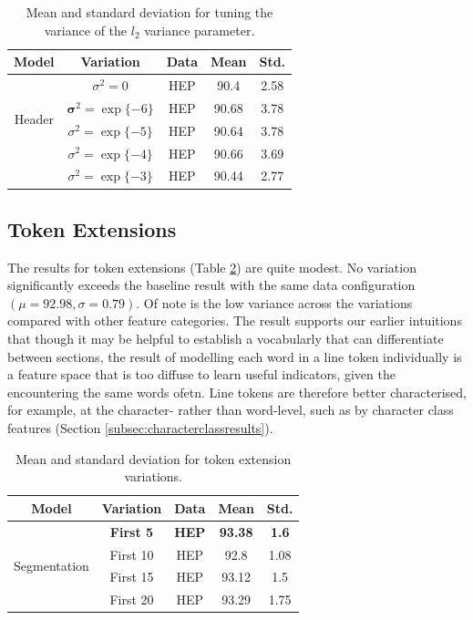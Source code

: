 \begin{table}[h]
\begin{center}
\begin{tabular}{|c|c|c|c|c|}
\hline
Model & Variation & Data & Mean & Std.\\
\hline
\multirow{4}{*}{Header} & $\sigma^2 = 0$ & HEP & 90.4 & 2.58\\\cline{2-5}
& $\mathbf \sigma^2 = \exp\{-6\}$ & HEP & 90.68 & 3.78\\\cline{2-5}
& $\sigma^2 = \exp\{-5\}$ & HEP & 90.64 & 3.78\\\cline{2-5}
& $\sigma^2 = \exp\{-4\}$ & HEP & 90.66 & 3.69\\\cline{2-5}
& $\sigma^2 = \exp\{-3\}$ & HEP & 90.44 & 2.77\\\cline{2-5}
\hline
\end{tabular}
\caption{Mean and standard deviation for tuning the variance of the $l_2$ variance parameter.}
\label{table:regularisationresults}
\end{center}
\end{table}

\subsection{Token Extensions}
\label{subsec:tokenextensionresults}

The results for token extensions (Table \ref{table:tokenextensions}) are quite modest. No variation significantly exceeds the baseline result with the same data configuration $(\mu = 92.98, \sigma = 0.79)$. Of note is the low variance across the variations compared with other feature categories. The result supports our earlier intuitions that though it may be helpful to establish a vocabularly that can differentiate between sections, the result of modelling each word in a line token individually is a feature space that is too diffuse to learn useful indicators, given the encountering the same words ofetn. Line tokens are therefore better characterised, for example, at the character- rather than word-level, such as by character class features (Section \ref{subsec:characterclassresults}).

\begin{table}[h]
\begin{center}
\begin{tabular}{|c|c|c|c|c|}
\hline
Model & Variation & Data & Mean & Std.\\
\hline
\multirow{4}{*}{Segmentation} & \textbf{First 5} & \textbf{HEP} & \textbf{93.38} & \textbf{1.6}\\\cline{2-5}
& First 10 & HEP & 92.8 & 1.08\\\cline{2-5}
& First 15 & HEP & 93.12 & 1.5\\\cline{2-5}
& First 20 & HEP & 93.29 & 1.75\\\cline{2-5}
\hline
\end{tabular}
\caption{Mean and standard deviation for token extension variations.}
\label{table:tokenextensions}
\end{center}
\end{table}

